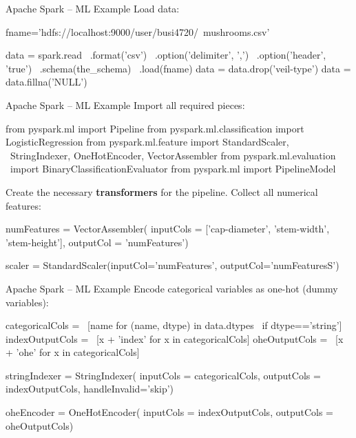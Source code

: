 \documentclass[ignorenonframetext,xcolor=x11names]{beamer}
\begin{document}
\begin{frame}[fragile]{Apache Spark -- ML Example}
Load data:
\begin{pythoncode}
fname='hdfs://localhost:9000/user/busi4720/\
mushrooms.csv'

data = spark.read \
    .format('csv') \
    .option('delimiter', ',') \
    .option('header', 'true') \
    .schema(the_schema) \
    .load(fname)
data = data.drop('veil-type')
data = data.fillna('NULL')
\end{pythoncode}
\end{frame}

\begin{frame}[fragile]{Apache Spark -- ML Example}
Import all required pieces:
\begin{pythoncode}
from pyspark.ml import Pipeline
from pyspark.ml.classification import LogisticRegression
from pyspark.ml.feature import StandardScaler, \
    StringIndexer, OneHotEncoder, VectorAssembler
from pyspark.ml.evaluation \
    import BinaryClassificationEvaluator
from pyspark.ml import PipelineModel
\end{pythoncode}
Create the necessary \textbf{transformers} for the pipeline. Collect all numerical features:
\begin{pythoncode}
numFeatures = VectorAssembler(
    inputCols = ['cap-diameter', 'stem-width', 
                 'stem-height'],
    outputCol = 'numFeatures')

scaler = StandardScaler(inputCol='numFeatures',
                        outputCol='numFeaturesS')
\end{pythoncode}
\end{frame}

\begin{frame}[fragile]{Apache Spark -- ML Example}
Encode categorical variables as one-hot (dummy variables):
\begin{pythoncode}
categoricalCols = \
    [name for (name, dtype) in data.dtypes \
        if dtype=='string']
indexOutputCols = \
    [x + 'index' for x in categoricalCols]
oheOutputCols = \
    [x + 'ohe' for x in categoricalCols]

stringIndexer = StringIndexer(
    inputCols = categoricalCols,
    outputCols = indexOutputCols,
    handleInvalid='skip')

oheEncoder = OneHotEncoder(
    inputCols = indexOutputCols,
    outputCols = oheOutputCols)
\end{pythoncode}
\end{frame}
\end{document}
